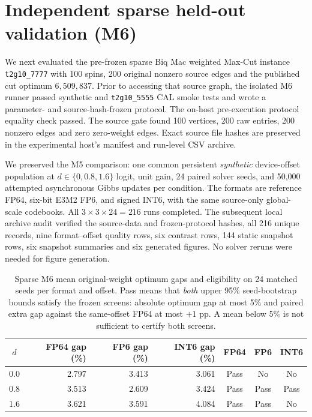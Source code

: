 \section{Independent sparse held-out validation (M6)}
\label{sec:m6-heldout}

We next evaluated the pre-frozen sparse Biq Mac weighted Max-Cut
instance \texttt{t2g10\_7777} with 100 spins, 200 original
nonzero source edges and the published cut optimum $6{,}509{,}837$.
Prior to accessing that source graph, the isolated M6 runner passed
synthetic and \texttt{t2g10\_5555} CAL smoke tests and wrote a
parameter- and source-hash-frozen protocol. The on-host
pre-execution protocol equality check passed. The source gate found
100 vertices, 200 raw entries, 200 nonzero edges and zero zero-weight
edges. Exact source file hashes are preserved in the experimental
host's manifest and run-level CSV archive.

We preserved the M5 comparison: one common persistent
\emph{synthetic} device-offset population at $d\in\{0,0.8,1.6\}$
logit, unit gain, 24 paired solver seeds, and 50,000 attempted
asynchronous Gibbs updates per condition. The formats are reference
FP64, six-bit E3M2 FP6, and signed INT6, with the same source-only
global-scale codebooks. All $3\times3\times24=216$ runs completed.
The subsequent local archive audit verified the source-data and
frozen-protocol hashes, all 216 unique records, nine format--offset
quality rows, six contrast rows, 144 static snapshot rows, six
snapshot summaries and six generated figures. No solver reruns were
needed for figure generation.

\begin{table}[htbp]\centering\small
\begin{tabular}{@{}c rrr ccc@{}}\toprule
$d$ & FP64 gap (\%) & FP6 gap (\%) & INT6 gap (\%)
& FP64 & FP6 & INT6\\\midrule
0.0 & 2.797 & 3.413 & 3.061 & Pass & No & No\\
0.8 & 3.513 & 2.609 & 3.424 & Pass & Pass & Pass\\
1.6 & 3.621 & 3.591 & 4.084 & Pass & Pass & No\\\bottomrule
\end{tabular}
\caption{Sparse M6 mean original-weight optimum gaps and eligibility
on 24 matched seeds per format and offset. Pass means that
\emph{both} upper 95\% seed-bootstrap bounds satisfy the
frozen screens: absolute optimum gap at most 5\% and paired
extra gap against the same-offset FP64 at most $+1$ pp.
A mean below 5\% is not sufficient to certify both screens.}
\label{tab:m6-quality}
\end{table}

